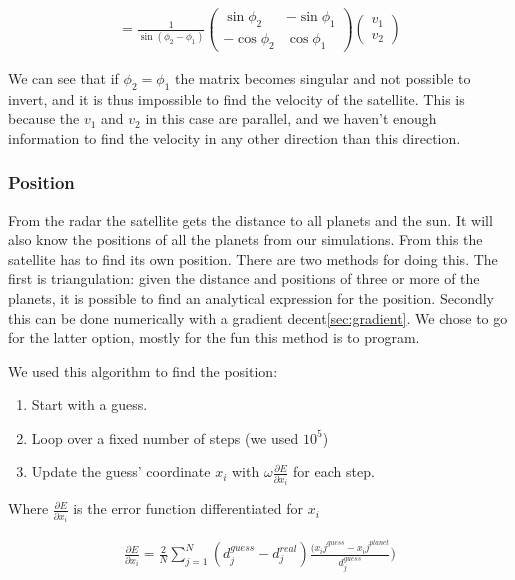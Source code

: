 \documentclass[a4paper, 10pt]{article}
\begin{document}
\begin{align}
=
\frac{1}{\sin (\phi_2 - \phi_1)}
\begin{pmatrix}
\sin \phi_2 & -\sin \phi_1 \\
-\cos \phi_2 & \cos \phi_1 
\end{pmatrix}
\begin{pmatrix}
v_1\\
v_2
\end{pmatrix}
\end{align}

We can see that if $\phi_2 = \phi_1$ the matrix becomes singular and not possible to invert, and it is thus impossible to find the velocity of the satellite. This is because the $v_1$ and $v_2$ in this case are parallel, and we haven't enough information to find the velocity in any other direction than this direction.


\subsubsection{Position}
From the radar the satellite gets the distance to all planets and the sun. It will also know the positions of all the planets from our simulations. From this the satellite has to find its own position. There are two methods for doing this. The first is triangulation: given the distance and positions of three or more of the planets, it is possible to find an analytical expression for the position. Secondly this can be done numerically with a gradient decent\ref{sec:gradient}. We chose to go for the latter option, mostly for the fun this method is to program.

We used this algorithm to find the position:

\begin{enumerate}
\item Start with a guess.
\item Loop over a fixed number of steps (we used $10^{5}$)
\item Update the guess' coordinate $x_i$ with $\omega \frac{\partial E}{\partial x_i}$ for each step.
\end{enumerate}

Where $\frac{\partial E}{\partial x_i}$ is the error function differentiated for $x_i$

\begin{align}
\frac{\partial E}{\partial x_i} = \frac{2}{N}\sum_{j=1}^N (d_j^{guess} - d_j^{real})\frac{(x_ij^{guess} - x_ij^{planet}}{d_j^{guess}})
\end{align}
\end{document}
